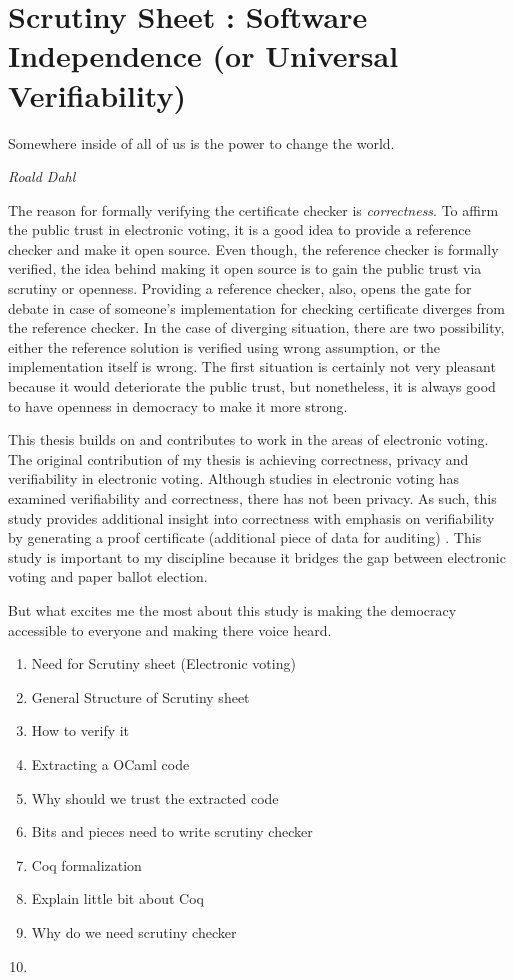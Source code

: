 \chapter{Scrutiny Sheet : Software Independence (or Universal Verifiability)}
\label{cha:software_independence}

\epigraph{Somewhere inside of all of us is the power to change the world.} 
{\textit{Roald Dahl }}


The reason for formally verifying  the certificate checker is \emph{correctness}. 
To affirm the public trust in electronic voting, it is a good idea to provide a reference 
checker and make it open source.  Even though, the reference checker is formally verified, 
the idea behind making it open source is to gain the public trust  via scrutiny or openness.  
Providing a reference checker, also,  opens the gate for debate in case of 
someone's implementation for checking certificate diverges from the reference checker.  
In the case of diverging situation, there are two possibility, either the reference solution is verified 
using wrong assumption,  or the implementation itself is wrong.  The first situation is certainly 
not very pleasant because it would deteriorate the public trust, but nonetheless, it is always good to 
have openness in democracy to make it more strong.




This thesis builds on and contributes to work in the areas of electronic voting. 
The original contribution of my thesis is achieving correctness, privacy and verifiability in 
electronic voting. Although studies in electronic voting has examined verifiability and correctness, 
there has not been privacy.   As such, this study provides additional insight into correctness with 
emphasis on verifiability by generating a proof certificate (additional piece of data for auditing) . 
This study is important to my discipline because it bridges the gap between electronic voting 
and paper ballot election. 

But what excites me the most about this study is making the democracy accessible to everyone
and making there voice heard. 

\begin{enumerate}
\item Need for Scrutiny sheet (Electronic voting)
\item General Structure of Scrutiny sheet
\item How to verify it
\item Extracting a OCaml code
\item Why should we trust the extracted code
\item Bits and pieces need to write scrutiny checker
\item Coq formalization
\item Explain little bit about Coq
\item Why do we need scrutiny checker
\item 
\end{enumerate}





